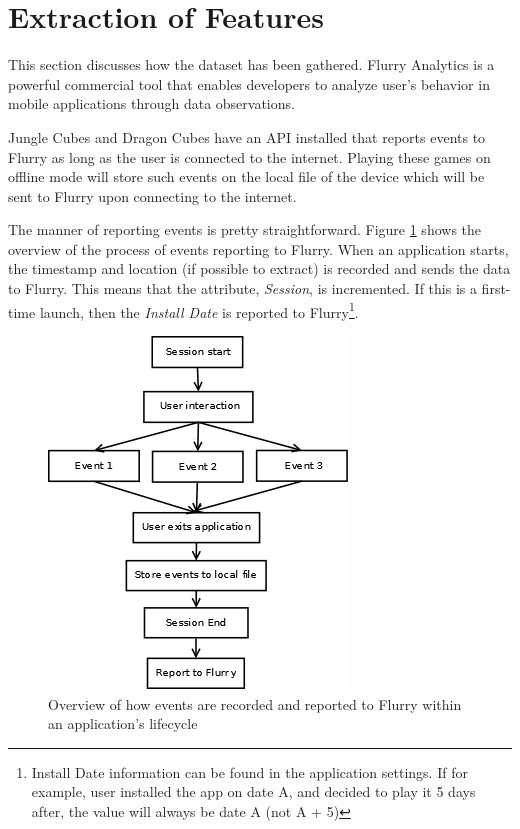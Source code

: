 \section{Extraction of Features}
This section discusses how the dataset has been gathered. Flurry Analytics is a powerful commercial tool that enables developers to analyze user's behavior in mobile applications through data observations.

Jungle Cubes and Dragon Cubes have an API installed that reports events to Flurry as long as the user is connected to the internet. Playing these games on offline mode will store such events on the local file of the device which will be sent to Flurry upon connecting to the internet.

The manner of reporting events is pretty straightforward. Figure \ref{fig:flurry_flow} shows the overview of the process of events reporting to Flurry. When an application starts, the timestamp and location (if possible to extract) is recorded and sends the data to Flurry. This means that the attribute, \textit{Session}, is incremented. If this is a first-time launch, then the \textit{Install Date} is reported to Flurry\footnote{Install Date information can be found in the application settings. If for example, user installed the app on date A, and decided to play it 5 days after, the value will always be date A (not A + 5)}. 
\begin{figure}[h]
\centering
\includegraphics[scale=0.4]{figures/FlurryFlow.png} 
\caption{Overview of how events are recorded and reported to Flurry within an application's lifecycle}
\label{fig:flurry_flow}
\end{figure}

